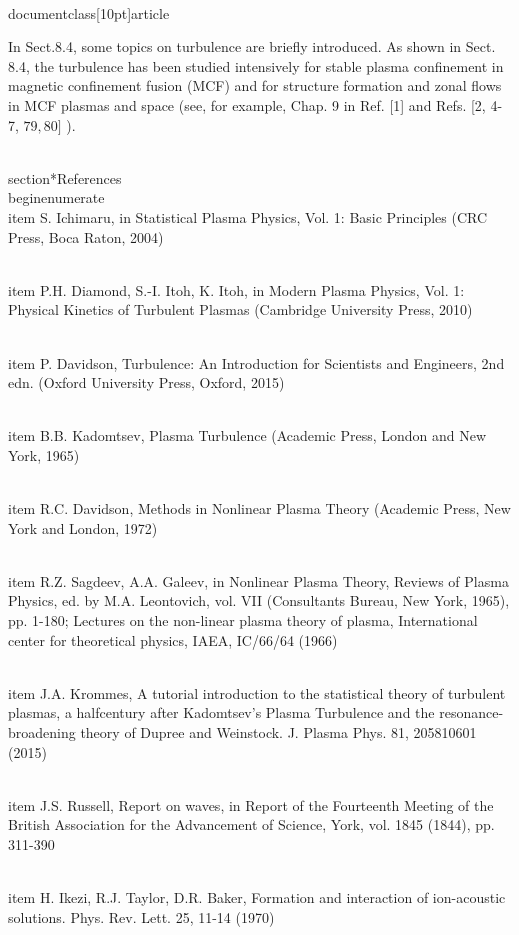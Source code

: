 \\documentclass[10pt]{article}
\begin{document}
{{{{{In Sect.8.4, some topics on turbulence are briefly introduced. As shown in Sect. 8.4, the turbulence has been studied intensively for stable plasma confinement in magnetic confinement fusion (MCF) and for structure formation and zonal flows in MCF plasmas and space (see, for example, Chap. 9 in Ref. [1] and Refs. [2, 4-7, $79,80]$ ).

\\section*{References}
\\begin{enumerate}
  \\item S. Ichimaru, in Statistical Plasma Physics, Vol. 1: Basic Principles (CRC Press, Boca Raton, 2004)

  \\item P.H. Diamond, S.-I. Itoh, K. Itoh, in Modern Plasma Physics, Vol. 1: Physical Kinetics of Turbulent Plasmas (Cambridge University Press, 2010)

  \\item P. Davidson, Turbulence: An Introduction for Scientists and Engineers, 2nd edn. (Oxford University Press, Oxford, 2015)

  \\item B.B. Kadomtsev, Plasma Turbulence (Academic Press, London and New York, 1965)

  \\item R.C. Davidson, Methods in Nonlinear Plasma Theory (Academic Press, New York and London, 1972)

  \\item R.Z. Sagdeev, A.A. Galeev, in Nonlinear Plasma Theory, Reviews of Plasma Physics, ed. by M.A. Leontovich, vol. VII (Consultants Bureau, New York, 1965), pp. 1-180; Lectures on the non-linear plasma theory of plasma, International center for theoretical physics, IAEA, IC/66/64 (1966)

  \\item J.A. Krommes, A tutorial introduction to the statistical theory of turbulent plasmas, a halfcentury after Kadomtsev's Plasma Turbulence and the resonance-broadening theory of Dupree and Weinstock. J. Plasma Phys. 81, 205810601 (2015)

  \\item J.S. Russell, Report on waves, in Report of the Fourteenth Meeting of the British Association for the Advancement of Science, York, vol. 1845 (1844), pp. 311-390

  \\item H. Ikezi, R.J. Taylor, D.R. Baker, Formation and interaction of ion-acoustic solutions. Phys. Rev. Lett. 25, 11-14 (1970)

}}}}}
\end{document}

